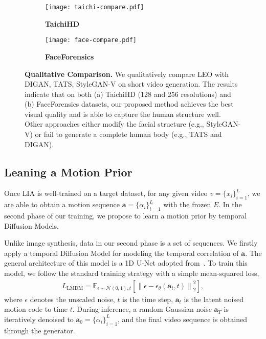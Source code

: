 {\begin{figure*}[t!]
\centering
\begin{subfigure}[t]{1.0\textwidth}
\centering
\texttt{[image: taichi-compare.pdf]}
\caption{\footnotesize{\textbf{TaichiHD}}}
\end{subfigure}
\begin{subfigure}[t]{1.0\textwidth}
\centering
\texttt{[image: face-compare.pdf]}
\caption{\footnotesize{\textbf{FaceForensics}}}
\end{subfigure}
\caption{\textbf{Qualitative Comparison.} We qualitatively compare LEO with DIGAN, TATS, StyleGAN-V on short video generation. The results indicate that on both (a) TaichiHD (128 and 256 resolutions) and (b) FaceForensics datasets, our proposed method achieves the best visual quality and is able to capture the human structure well. Other approaches either modify the facial structure (e.g., StyleGAN-V) or fail to generate a complete human body (e.g., TATS and DIGAN).}
\label{fig:qualitative}
\end{figure*} 

\subsection{Leaning a Motion Prior}
Once LIA is well-trained on a target dataset, for any given video $v=\{x_i\}^{L}_{i=1}$, we are able to obtain a motion sequence $\mathbf{a}=\{\alpha_i\}^{L}_{i=1}$ with the frozen $E$. In the second phase of our training, we propose to learn a motion prior by temporal Diffusion Models. 

Unlike image synthesis, data in our second phase is a set of sequences. We firstly apply a temporal Diffusion Model for modeling the temporal correlation of $\mathbf{a}$. The general architecture of this model is a 1D U-Net adopted from~\cite{ddpm}. To train this model, we follow the standard training strategy with a simple mean-squared loss,
\begin{align}
    L_{\text{LMDM}} = \mathbb{E}_{\epsilon \sim \mathcal{N} (0,1), t}\left [ \left \| \epsilon - \epsilon_{\theta}(\mathbf{a}_t, t)\right \|^{2}_{2}\right],  
\end{align}
where $\epsilon$ denotes the unscaled noise, $t$ is the time step, $\mathbf{a}_t$ is the latent noised motion code to time $t$. During inference, a random Gaussian noise $\mathbf{a}_T$ is iteratively denoised to $\mathbf{a}_0=\{\alpha_i\}^{L}_{i=1}$, and the final video sequence is obtained through the generator. %

}
